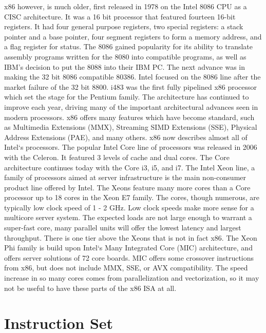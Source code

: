 \documentclass[10pt]{article}
\begin{document}
x86 however, is much older, first released in 1978 on the Intel 8086 CPU as a CISC architecture. It was a 16 bit processor that featured fourteen 16-bit registers. It had four general purpose registers, two special registers: a stack pointer and a base pointer, four segment registers to form a memory address, and a flag register for status. The 8086 gained popularity for its ability to translate assembly programs written for the 8080 into compatible programs, as well as IBM’s decision to put the 8088 into their IBM PC. The next advance was in making the 32 bit 8086 compatible 80386. Intel focused on the 8086 line after the market failure of the 32 bit 8800. i483 was the first fully pipelined x86 processor which set the stage for the Pentium family. The architecture has continued to improve each year, driving many of the important architectural advances seen in modern processors. x86 offers many features which have become standard, such as Multimedia Extensions (MMX), Streaming SIMD Extensions (SSE), Physical Address Extensions (PAE), and many others. x86 now describes almost all of Intel`s processors. The popular Intel Core line of processors was released in 2006 with the Celeron. It featured 3 levels of cache and dual cores. The Core architecture continues today with the Core i3, i5, and i7. The Intel Xeon line, a family of processors aimed at server infrastructure is the main non-consumer product line offered by Intel. The Xeons feature many more cores than a Core processor up to 18 cores in the Xeon E7 family. The cores, though numerous, are typically low clock speed of 1 - 2 GHz. Low clock speeds make more sense for a multicore server system. The expected loads are not large enough to warrant a super-fast core, many parallel units will offer the lowest latency and largest throughput. There is one tier above the Xeons that is not in fact x86. The Xeon Phi family is build upon Intel`s Many Integrated Core (MIC) architecture, and offers server solutions of 72 core boards. MIC offers some crossover instructions from x86, but does not include MMX, SSE, or AVX compatibility. The speed increase in so many cores comes from parallelization and vectorization, so it may not be useful to have these parts of the x86 ISA at all.  
\par

\section{Instruction Set}
\end{document}
